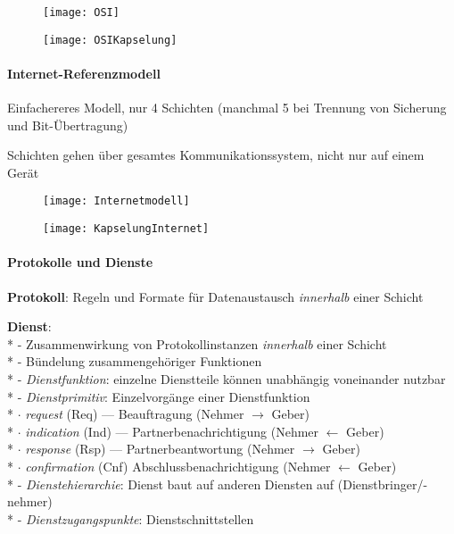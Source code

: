 \begin{figure}[H]\centering\label{OSI}\texttt{[image: OSI]}\end{figure}
\begin{figure}[H]\centering\label{OSIKapselung}\texttt{[image: OSIKapselung]}\end{figure}

\newpage

\paragraph{Internet-Referenzmodell}
\begin{items}
  \item Einfachereres Modell, nur 4 Schichten (manchmal 5 bei Trennung von Sicherung und Bit-Übertragung)
  \item Schichten gehen über gesamtes Kommunikationssystem, nicht nur auf einem Gerät
\end{items}
\begin{figure}[H]\centering\label{Internetmodell}\texttt{[image: Internetmodell]}\end{figure}
\begin{figure}[H]\centering\label{KapselungInternet}\texttt{[image: KapselungInternet]}\end{figure}

\paragraph{Protokolle und Dienste}
\begin{items}
  \item \textbf{Protokoll}: Regeln und Formate für Datenaustausch \emph{innerhalb} einer Schicht
  \item \textbf{Dienst}: \\*
    - Zusammenwirkung von Protokollinstanzen \emph{innerhalb} einer Schicht \\*
    - Bündelung zusammengehöriger Funktionen \\*
    - \emph{Dienstfunktion}: einzelne Dienstteile können unabhängig voneinander nutzbar \\*
    - \emph{Dienstprimitiv}: Einzelvorgänge einer Dienstfunktion \\*
      \phantom{-} \( \cdot \) \emph{request} (Req) --- Beauftragung (Nehmer \( \to \) Geber) \\*
      \phantom{-} \( \cdot \) \emph{indication} (Ind) --- Partnerbenachrichtigung (Nehmer \( \leftarrow \) Geber) \\*
      \phantom{-} \( \cdot \) \emph{response} (Rsp) --- Partnerbeantwortung (Nehmer \( \to \) Geber) \\*
      \phantom{-} \( \cdot \) \emph{confirmation} (Cnf) Abschlussbenachrichtigung (Nehmer \( \leftarrow  \) Geber) \\*
    - \emph{Dienstehierarchie}: Dienst baut auf anderen Diensten auf (Dienstbringer/-nehmer) \\*
    - \emph{Dienstzugangspunkte}: Dienstschnittstellen
\end{items}


